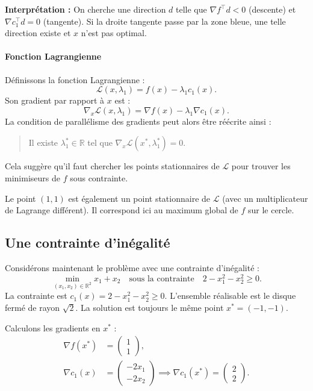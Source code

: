 \begin{figureexplanation}
\textbf{Interprétation :} On cherche une direction $d$ telle que $\nabla f^\top d < 0$ (descente) et $\nabla c_1^\top d = 0$ (tangente). Si la droite tangente passe par la zone bleue, une telle direction existe et $x$ n'est pas optimal.
\end{figureexplanation}

\paragraph{Fonction Lagrangienne}
Définissons la fonction Lagrangienne :
\begin{equation}
    \mathcal{L}(x, \lambda_1) = f(x) - \lambda_1 c_1(x).
\end{equation}
Son gradient par rapport à $x$ est :
\begin{equation}
    \nabla_x \mathcal{L}(x, \lambda_1) = \nabla f(x) - \lambda_1 \nabla c_1(x).
\end{equation}
La condition de parallélisme des gradients peut alors être réécrite ainsi :
\begin{quote}
Il existe $\lambda_1^* \in \mathbb{R}$ tel que $\nabla_x \mathcal{L}(x^*, \lambda_1^*) = 0$.
\end{quote}
Cela suggère qu'il faut chercher les points stationnaires de $\mathcal{L}$ pour trouver les minimiseurs de $f$ sous contrainte.

\begin{remarque}
Le point $(1, 1)$ est également un point stationnaire de $\mathcal{L}$ (avec un multiplicateur de Lagrange différent). Il correspond ici au maximum global de $f$ sur le cercle.
\end{remarque}

\subsection{Une contrainte d'inégalité}

Considérons maintenant le problème avec une contrainte d'inégalité :
\begin{equation}
    \min_{(x_1, x_2) \in \mathbb{R}^2} x_1 + x_2 \quad \text{sous la contrainte} \quad 2 - x_1^2 - x_2^2 \geq 0.
\end{equation}
La contrainte est $c_1(x) = 2 - x_1^2 - x_2^2 \geq 0$. L'ensemble réalisable est le disque fermé de rayon $\sqrt{2}$. La solution est toujours le même point $x^* = (-1, -1)$.

Calculons les gradients en $x^*$ :
\begin{align*}
    \nabla f(x^*) &= \begin{pmatrix} 1 \\ 1 \end{pmatrix}, \\
    \nabla c_1(x) &= \begin{pmatrix} -2x_1 \\ -2x_2 \end{pmatrix} \implies \nabla c_1(x^*) = \begin{pmatrix} 2 \\ 2 \end{pmatrix}.
\end{align*}

